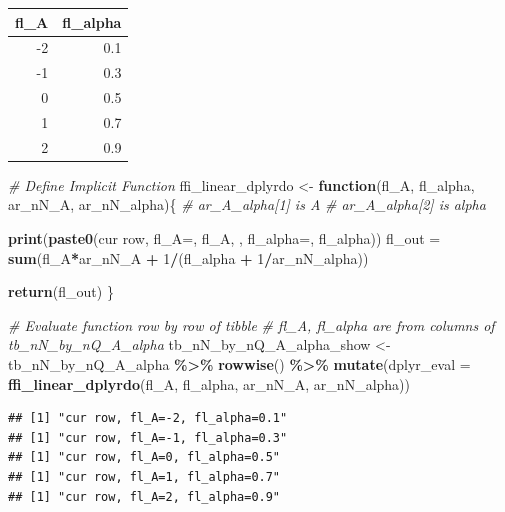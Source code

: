\documentclass[
]{book}
\newenvironment{Shaded}{\begin{snugshade}}{\end{snugshade}}
\newcommand{\CommentTok}[1]{\textcolor[rgb]{0.56,0.35,0.01}{\textit{#1}}}
\newcommand{\ControlFlowTok}[1]{\textcolor[rgb]{0.13,0.29,0.53}{\textbf{#1}}}
\newcommand{\DataTypeTok}[1]{\textcolor[rgb]{0.13,0.29,0.53}{#1}}
\newcommand{\DecValTok}[1]{\textcolor[rgb]{0.00,0.00,0.81}{#1}}
\newcommand{\KeywordTok}[1]{\textcolor[rgb]{0.13,0.29,0.53}{\textbf{#1}}}
\newcommand{\NormalTok}[1]{#1}
\newcommand{\OperatorTok}[1]{\textcolor[rgb]{0.81,0.36,0.00}{\textbf{#1}}}
\newcommand{\StringTok}[1]{\textcolor[rgb]{0.31,0.60,0.02}{#1}}
\begin{document}
\begin{table}[!h]
\centering
\begin{tabular}{r|r}
\hline
fl\_A & fl\_alpha\\
\hline
\rowcolor{gray!6}  -2 & 0.1\\
\hline
-1 & 0.3\\
\hline
\rowcolor{gray!6}  0 & 0.5\\
\hline
1 & 0.7\\
\hline
\rowcolor{gray!6}  2 & 0.9\\
\hline
\end{tabular}
\end{table}

\begin{Shaded}
\begin{Highlighting}[]
\CommentTok{\# Define Implicit Function}
\NormalTok{ffi\_linear\_dplyrdo \textless{}{-}}\StringTok{ }\ControlFlowTok{function}\NormalTok{(fl\_A, fl\_alpha, ar\_nN\_A, ar\_nN\_alpha)\{}
  \CommentTok{\# ar\_A\_alpha[1] is A}
  \CommentTok{\# ar\_A\_alpha[2] is alpha}

  \KeywordTok{print}\NormalTok{(}\KeywordTok{paste0}\NormalTok{(}\StringTok{\textquotesingle{}cur row, fl\_A=\textquotesingle{}}\NormalTok{, fl\_A, }\StringTok{\textquotesingle{}, fl\_alpha=\textquotesingle{}}\NormalTok{, fl\_alpha))}
\NormalTok{  fl\_out =}\StringTok{ }\KeywordTok{sum}\NormalTok{(fl\_A}\OperatorTok{*}\NormalTok{ar\_nN\_A }\OperatorTok{+}\StringTok{ }\DecValTok{1}\OperatorTok{/}\NormalTok{(fl\_alpha }\OperatorTok{+}\StringTok{ }\DecValTok{1}\OperatorTok{/}\NormalTok{ar\_nN\_alpha))}

  \KeywordTok{return}\NormalTok{(fl\_out)}
\NormalTok{\}}

\CommentTok{\# Evaluate function row by row of tibble}
\CommentTok{\# fl\_A, fl\_alpha are from columns of tb\_nN\_by\_nQ\_A\_alpha}
\NormalTok{tb\_nN\_by\_nQ\_A\_alpha\_show \textless{}{-}}\StringTok{ }\NormalTok{tb\_nN\_by\_nQ\_A\_alpha }\OperatorTok{\%\textgreater{}\%}
\StringTok{  }\KeywordTok{rowwise}\NormalTok{() }\OperatorTok{\%\textgreater{}\%}
\StringTok{  }\KeywordTok{mutate}\NormalTok{(}\DataTypeTok{dplyr\_eval =}
           \KeywordTok{ffi\_linear\_dplyrdo}\NormalTok{(fl\_A, fl\_alpha, ar\_nN\_A, ar\_nN\_alpha))}
\end{Highlighting}
\end{Shaded}

\begin{verbatim}
## [1] "cur row, fl_A=-2, fl_alpha=0.1"
## [1] "cur row, fl_A=-1, fl_alpha=0.3"
## [1] "cur row, fl_A=0, fl_alpha=0.5"
## [1] "cur row, fl_A=1, fl_alpha=0.7"
## [1] "cur row, fl_A=2, fl_alpha=0.9"
\end{verbatim}
\end{document}
